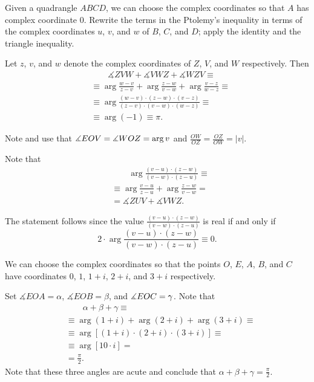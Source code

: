 \begin{multicols}{2}
 Given a quadrangle $ABCD$, we can choose the complex coordinates so that $A$ has complex coordinate $0$. 
Rewrite the terms in the Ptolemy's inequality in terms of the complex coordinates $u$, $v$, and $w$ of $B$, $C$, and $D$; apply the identity and the triangle inequality.


Let $z$, $v$, and $w$ denote the complex coordinates of $Z$, $V$, and $W$ respectively.
Then 
\begin{align*}
&\qquad \measuredangle ZVW+\measuredangle VWZ+\measuredangle WZV\equiv
\\
&\equiv
\arg \tfrac{w-v}{z-v}+\arg \tfrac{z-w}{v-w}+\arg \tfrac{v-z}{w-z}\equiv
\\
&\equiv
\arg \tfrac{(w-v)\cdot(z-w)\cdot(v-z)}{(z-v)\cdot(v-w)\cdot(w-z)}\equiv
\\
&\equiv\arg (-1)\equiv
\pi.
\end{align*}

Note and use that 
$
\measuredangle EOV=\measuredangle WOZ\z=\arg v$
and
$\frac{OW}{OZ}=\frac{OZ}{OW}=|v|$.


Note that 
\begin{align*}
&\qquad\arg\frac{(v-u)\cdot(z-w)}{(v-w)\cdot(z-u)}\equiv
\\
&\equiv
\arg\frac{v-u}{z-u}
+
\arg\frac{z-w}{v-w}=
\\
&= \measuredangle ZUV+\measuredangle VWZ.
\end{align*}

The statement follows since the value $\tfrac{(v-u)\cdot(z-w)}{(v-w)\cdot(z-u)}$ is real if and only if 
\[2\cdot\arg\frac{(v-u)\cdot(z-w)}{(v-w)\cdot(z-u)}\equiv0.\]

We can choose the complex coordinates so that the points $O$, $E$, $A$, $B$, and $C$ have coordinates
$0$, $1$, $1+i$, $2+i$, and $3+i$ respectively.

Set $\measuredangle EOA=\alpha$, $\measuredangle EOB=\beta$, and $\measuredangle EOC\z=\gamma$.
Note that
\begin{align*}
&\qquad\alpha+\beta+\gamma\equiv
\\
&\equiv\arg(1+i)+\arg(2+i)+\arg(3+i)\equiv
\\
&\equiv\arg[(1+i)\cdot(2+i)\cdot(3+i)]\equiv
\\
&\equiv\arg [10\cdot i]=
\\
&=\tfrac\pi2.
\end{align*}
Note that these three angles are acute and conclude that $\alpha+\beta+\gamma=\tfrac\pi2$.


\end{multicols}
